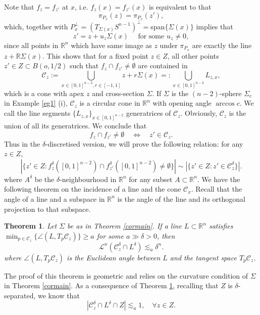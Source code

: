 \documentclass[11pt,a4paper,reqno]{amsart}
\newcommand{\R}{\mathbb{R}}
\newcommand{\calL}{\mathcal{L}}
\newcommand{\calC}{\mathcal{C}}
\newcommand{\1}{\mathbf{1}}
\numberwithin{equation}{section}
\theoremstyle{plain}
\newtheorem{thm}[equation]{Theorem}
\theoremstyle{definition}
\theoremstyle{remark}
\begin{document}
Note that $f_z = f_{z'}$ at $x$, i.e. $f_z(x)=f_{z'}(x)$ is equivalent to that
$$  \pi_{P_x}(z) = \pi_{P_x}(z'),$$
which, together with $P_x^\perp = (T_{\Sigma(x)}S^{n-1})^\perp= $span$\{\Sigma(x)\}$ implies that
$$  z' = z + u_z \Sigma(x) \quad \mbox{ for some $u_z \ne 0$},$$
since all points in $\R^n$ which have same image as $z$ under $\pi_{P_x}$ are exactly the line $z + \R \Sigma(x)$.
This shows that for a fixed point $z \in Z$, all other points $z' \in Z \subset B(o,1/2)$ such that $f_z \cap f_{z'} \ne \emptyset$ are contained in
$$  \calC_z:=  \bigcup_{x \in [0,1]^{n-2}, r \in [-1,1] } z + r \Sigma(x)= : \bigcup_{x \in [0,1]^{n-2}} L_{z,x},  $$
which is a cone with apex $z$ and cross-section $\Sigma$.
If $\Sigma$ is the $(n-2)$-sphere $\Sigma_c$ in Example \ref{eg1} (i), $\calC_z$ is a circular cone in $\R^n$ with opening angle $\arccos c$.
We call the line segments $\{L_{z,x}\}_{x\in [0,1]^{n-2}}$ generatrices of $\calC_z$. Obviously, $\calC_z$ is the union of all its generatrices.
We conclude that
\begin{equation*}
  f_z \cap f_{z'} \ne \emptyset \quad \Longleftrightarrow \quad z' \in \calC_z.
\end{equation*}
Thus in the $\delta$-discretised version, we will prove the following relation: for any $z \in Z$,
\begin{equation}\label{linecone0}
  |\{z' \in Z : f_z^\delta([0,1]^{n-2}) \cap f_{z'}^\delta([0,1]^{n-2}) \ne \emptyset \}| \sim |\{z' \in Z : z' \in \calC_z^\delta \}|.
\end{equation}
where $A^\delta$ be the $\delta$-neighbourhood in $\R^n$ for any subset $A \subset \R^n$.
We have the following theorem on the incidence of a line and the cone $\calC_x$. Recall that the angle of a line and a subspace in $\R^n$ is the angle of the line and its orthogonal projection to that subspace.
\begin{thm} \label{lineconen}
Let $\Sigma$ be as in Theorem \ref{cormain}.
If a line $L \subset \R^n$ satisfies $\min_{p \in \calC_z}\{\angle(L,T_p\calC_z)\}  \ge a$ for some $a \gg \delta >0$, then
  $$\calL^{n}(\calC_z^\delta \cap L^\delta) \lesssim_a \delta^n. $$
  where $\angle(L,T_p\calC_z)$ is the Euclidean angle between $L$ and the tangent space $T_p\calC_z$.
\end{thm}
The proof of this theorem is geometric and relies on the curvature condition of $\Sigma$ in Theorem \ref{cormain}.
As a consequence of Theorem \ref{lineconen}, recalling that $Z$ is $\delta$-separated, we know that
\begin{equation}\label{less1}
  |\calC_z^\delta \cap L^\delta \cap Z|\lesssim_a 1, \quad \forall z \in Z.
\end{equation}
\end{document}
